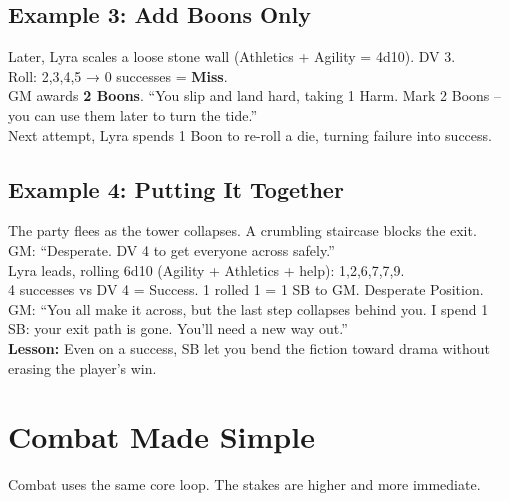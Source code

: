 \subsection*{Example 3: Add Boons Only}
\label{subsec:ex-boons-only}
\begin{tcolorbox}[colback=gray!3,colframe=gray!60,title=\textbf{Example 3 – Adding Boons}]
Later, Lyra scales a loose stone wall (Athletics + Agility = 4d10). DV 3.\\
Roll: 2,3,4,5 → 0 successes = \textbf{Miss}.\\[0.3em]
GM awards \textbf{2 Boons}. “You slip and land hard, taking 1 Harm. Mark 2 Boons – you can use them later to turn the tide.”\\
Next attempt, Lyra spends 1 Boon to re-roll a die, turning failure into success.
\end{tcolorbox}

\subsection*{Example 4: Putting It Together}
\label{subsec:ex-full}
\begin{tcolorbox}[colback=gray!3,colframe=gray!60,title=\textbf{Example 4 – SB + Boons + Position}]
The party flees as the tower collapses. A crumbling staircase blocks the exit.\\
GM: “Desperate. DV 4 to get everyone across safely.”\\
Lyra leads, rolling 6d10 (Agility + Athletics + help): 1,2,6,7,7,9.\\
4 successes vs DV 4 = Success. 1 rolled 1 = 1 SB to GM. Desperate Position.\\
GM: “You all make it across, but the last step collapses behind you. I spend 1 SB: your exit path is gone. You’ll need a new way out.”\\
\textbf{Lesson:} Even on a success, SB let you bend the fiction toward drama without erasing the player’s win.
\end{tcolorbox}

\section{Combat Made Simple}
\label{sec:combat-simple}

Combat uses the same core loop. The stakes are higher and more immediate.

